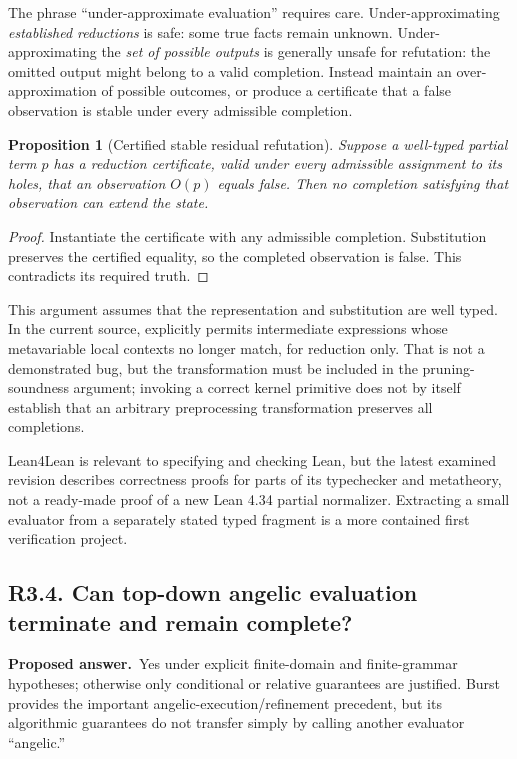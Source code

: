 \documentclass[11pt,a4paper]{article}
\newcommand{\code}[1]{\texttt{\small\detokenize{#1}}}
\newcommand{\question}[2]{\subsection{#1. #2}\label{q:#1}}
\newcommand{\answer}{\textbf{Proposed answer.}\ }
\newtheorem{proposition}{Proposition}[section]
\theoremstyle{remark}
\begin{document}
The phrase ``under-approximate evaluation'' requires care. Under-approximating
\emph{established reductions} is safe: some true facts remain unknown.
Under-approximating the \emph{set of possible outputs} is generally unsafe
for refutation: the omitted output might belong to a valid completion.
Instead maintain an over-approximation of possible outcomes, or produce a
certificate that a false observation is stable under every admissible
completion.

\begin{proposition}[Certified stable residual refutation]\label{prop:residual}
Suppose a well-typed partial term $p$ has a reduction certificate, valid
under every admissible assignment to its holes, that an observation
$O(p)$ equals false. Then no completion satisfying that observation can
extend the state.
\end{proposition}
\begin{proof}
Instantiate the certificate with any admissible completion. Substitution
preserves the certified equality, so the completed observation is false.
This contradicts its required truth.
\end{proof}

This argument assumes that the representation and substitution are well
typed. In the current source, \code{instantiatePartial} explicitly permits
intermediate expressions whose metavariable local contexts no longer match,
for reduction only. That is not a demonstrated bug, but the transformation
must be included in the pruning-soundness argument; invoking a correct
kernel primitive does not by itself establish that an arbitrary preprocessing
transformation preserves all completions.\cite{leantcore}

Lean4Lean is relevant to specifying and checking Lean, but the latest examined
revision describes correctness proofs for parts of its typechecker and
metatheory, not a ready-made proof of a new Lean 4.34 partial normalizer.
Extracting a small evaluator from a separately stated typed fragment is a
more contained first verification project.\cite{lean4lean}

\question{R3.4}{Can top-down angelic evaluation terminate and remain complete?}

\answer Yes under explicit finite-domain and finite-grammar hypotheses;
otherwise only conditional or relative guarantees are justified. Burst
provides the important angelic-execution/refinement precedent, but its
algorithmic guarantees do not transfer simply by calling another evaluator
``angelic.''\cite{burst}
\end{document}
